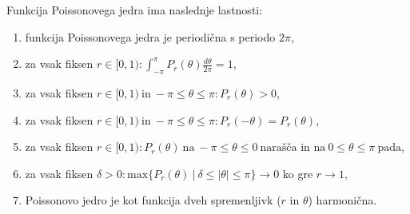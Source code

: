 \documentclass[mat1]{fmfdelo}
\begin{document}
    \begin{trditev}
        \label{lastpk}
        Funkcija Poissonovega jedra ima naslednje lastnosti:
        \begin{enumerate}
            \item funkcija Poissonovega jedra je periodična s periodo $2\pi$, 
            \item za vsak fiksen $r \in [0,1): \int_{-\pi}^{\pi}{P_r(\theta) \frac{d\theta}{2\pi}} = 1$,
            \item za vsak fiksen $r \in [0,1)~\text{in}~-\pi \leq \theta \leq \pi: P_r(\theta) > 0$,
            \item za vsak fiksen $r \in [0,1)~\text{in}~-\pi \leq \theta \leq \pi: P_r( - \theta) = P_r(\theta)$,
            \item za vsak fiksen $r \in [0,1): P_r(\theta)~\text{na}~-\pi \leq \theta \leq 0~\text{narašča in na}~0 \leq \theta \leq \pi~\text{pada}$,
            \item za vsak fiksen $\delta > 0: \text{max}\{P_r(\theta)~|~ \delta \leq |\theta| \leq \pi\} \to 0$ ko gre $r \to 1$,
            \item Poissonovo jedro je kot funkcija dveh spremenljivk ($r$ in $\theta$) harmonična.
        \end{enumerate}
    \end{trditev}
\end{document}
